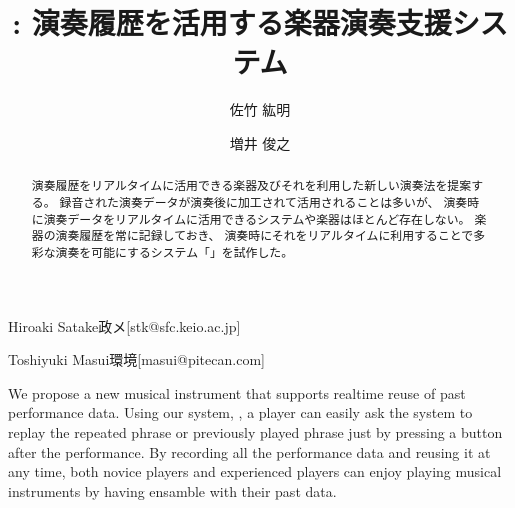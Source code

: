 \documentclass[submit,techreq]{ec2017}
\begin{document}
\title{{\system}: 演奏履歴を活用する楽器演奏支援システム}


  
\author{佐竹 紘明}{Hiroaki Satake}{政メ}[stk@sfc.keio.ac.jp]
\author{増井 俊之}{Toshiyuki Masui}{環境}[masui@pitecan.com]

\begin{abstract} %
  
  演奏履歴をリアルタイムに活用できる楽器及びそれを利用した新しい演奏法を提案する。
  録音された演奏データが演奏後に加工されて活用されることは多いが、
  演奏時に演奏データをリアルタイムに活用できるシステムや楽器はほとんど存在しない。
  楽器の演奏履歴を常に記録しておき、
  演奏時にそれをリアルタイムに利用することで多彩な演奏を可能にするシステム「{\system}」を試作した。
  
\end{abstract}


\begin{eabstract}

  We propose a new musical instrument that supports realtime reuse of
  past performance data.
  Using our system, \textit{\system},
  a player can easily ask the system to replay the repeated phrase or
  previously played phrase just by pressing a button after the performance.
  By recording all the performance data and reusing it at any time,
  both novice players and experienced players can enjoy playing musical instruments
  by having ensamble with their past data.
  
\end{eabstract}


\maketitle










\end{document}
